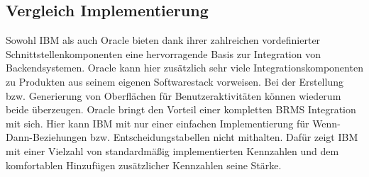 

\subsection{Vergleich Implementierung}
Sowohl IBM als auch Oracle bieten dank ihrer zahlreichen vordefinierter Schnittstellenkomponenten eine hervorragende Basis zur Integration von Backendsystemen. Oracle kann hier zusätzlich sehr viele Integrationskomponenten zu Produkten aus seinem eigenen Softwarestack vorweisen. Bei der Erstellung bzw. Generierung von Oberflächen für Benutzeraktivitäten können wiederum beide überzeugen. Oracle bringt den Vorteil einer kompletten \ac{BRMS} Integration mit sich. Hier kann IBM mit nur einer einfachen Implementierung für Wenn-Dann-Beziehungen bzw. Entscheidungstabellen nicht mithalten. Dafür zeigt IBM mit einer Vielzahl von standardmäßig implementierten Kennzahlen und dem komfortablen Hinzufügen zusätzlicher Kennzahlen seine Stärke.

